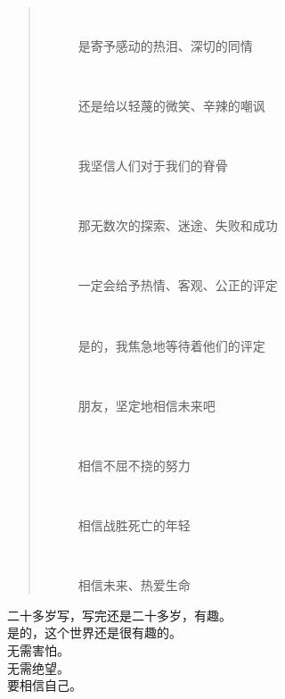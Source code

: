 \begin{multicols}{\theparacolNo}
\begin{quote}
\begin{spacing}{0.5}
{{\begin{description}
					\item[\textcolor{Gray}{\FA }] 是寄予感动的热泪、深切的同情
					\item[\textcolor{Gray}{\FA }] 还是给以轻蔑的微笑、辛辣的嘲讽
					\item[\textcolor{Gray}{\FA }] 我坚信人们对于我们的脊骨
					\item[\textcolor{Gray}{\FA }] 那无数次的探索、迷途、失败和成功
					\item[\textcolor{Gray}{\FA }] 一定会给予热情、客观、公正的评定
					\item[\textcolor{Gray}{\FA }] 是的，我焦急地等待着他们的评定
					\item[\textcolor{Gray}{\FA }] 朋友，坚定地相信未来吧
					\item[\textcolor{Gray}{\FA }] 相信不屈不挠的努力
					\item[\textcolor{Gray}{\FA }] 相信战胜死亡的年轻
					\item[\textcolor{Gray}{\FA }] 相信未来、热爱生命
				\end{description}
		}}
	\end{spacing}
\end{quote}

二十多岁写，写完还是二十多岁，有趣。\\

是的，这个世界还是很有趣的。\\

无需害怕。\\

无需绝望。\\

要相信自己。\\
\ifnum{}
	\end{multicols}
\fi

